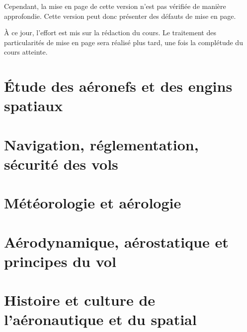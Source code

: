 \documentclass[a4paper,12pt,oneside]{report} %
\begin{document}
	Cependant, la mise en page de cette version n'est pas vérifiée de manière approfondie. Cette version peut donc présenter des défauts de mise en page.

	À ce jour, l'effort est mis sur la rédaction du cours. Le traitement des particularités de mise en page sera réalisé plus tard, une fois la complétude du cours atteinte.
	\fi

	\chapter{Étude des aéronefs et des engins spatiaux}
	\label{aeronef}
		
		
		
		
		
	
	\chapter{Navigation, réglementation, sécurité des vols}
	\label{nav}
		
		
		
	
	\ifdefined\activerrelease 
	\else
	\chapter{Météorologie et aérologie}
	\label{meteo}
		
		
		
		
		
	\fi
	
	\chapter{Aérodynamique, aérostatique et principes du vol}
	\label{aerodynamique}
	    
		
		
		
		
	
	\ifdefined\activerrelease 
	\else
	\chapter{Histoire et culture de l'aéronautique et du spatial}
	\label{histoire}
		
		
		
		
	\fi
		
\end{document}
